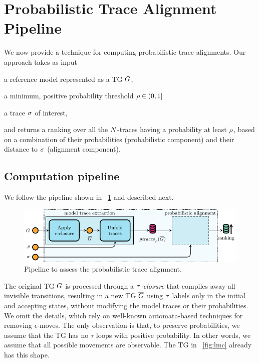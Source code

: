 
\section{Probabilistic Trace Alignment Pipeline}
We now provide a technique for computing probabilistic trace alignments. Our approach takes as input
\begin{inparaenum}[\it (i)]
\item a reference model represented as a TG $G$,
\item a minimum, positive probability threshold $\rho \in (0,1]$
\item a trace $\sigma$ of interest,
\end{inparaenum}
and returns a ranking over all the $N$-traces having a probability at least $\rho$, based on a combination of their probabilities
(probabilistic component) and their distance to $\sigma$ (alignment component).


\subsection{Computation pipeline}
We follow the pipeline shown in \figurename~\ref{fig:pipe} and described next.
%
\begin{figure}[!t]
	\includegraphics[width=\columnwidth]{images/pipelineShort}
	\caption{Pipeline to assess the probabilistic trace alignment.}\label{fig:pipe}
\end{figure}
%
%
%
The original TG $G$ is processed through a \emph{$\tau$-closure} that compiles away all invisible transitions, resulting in
a new TG $\overline{G}$ using $\tau$ labels only in the initial and accepting states, without modifying the
model traces or their probabilities. We omit the details, which rely on well-known automata-based techniques for removing
$\epsilon$-moves. The only observation is that, to preserve probabilities, we assume that the TG has no $\tau$ loops with
positive probability. In other words, we assume that all possible movements are observable.
The TG in \figurename~\ref{fig:lmc} already has this shape.

